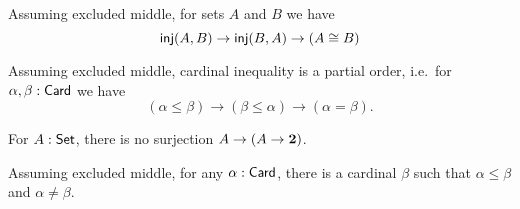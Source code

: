 \documentclass[hott-all.tex]{subfiles}
\begin{document}
% 
% 
\begin{thm}
  Assuming excluded middle, for sets $A$ and $B$ we have
  \[ \mathsf{inj}(A,B) \to \mathsf{inj}(B,A) \to (A\cong B) \]
\end{thm}
% 
\begin{cor}
  Assuming excluded middle, cardinal inequality is a partial order, i.e.\ for $\alpha,\beta:\mathsf{Card}$ we have
  \[ (\alpha\le\beta) \to (\beta\le\alpha) \to (\alpha=\beta). \]
\end{cor}
% 
% 
\begin{thm}[Cantor]
  For $A:\mathsf{Set}$, there is no surjection $A \to (A\to \mathbf{2})$.
\end{thm}
% 
\begin{cor}
  Assuming excluded middle, for any $\alpha:\mathsf{Card}$, there is a cardinal $\beta$ such that $\alpha\le\beta$ and $\alpha\neq\beta$.
\end{cor}
\end{document}
